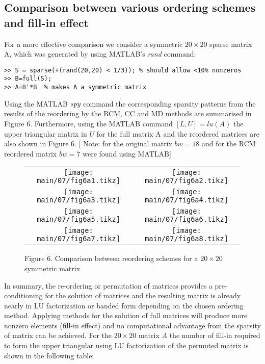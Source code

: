 
\subsection{Comparison between various ordering schemes and fill-in effect}
For a more effective comparison we consider a symmetric $20 \times 20$ sparse
matrix A, which was generated by using MATLAB's {\it{rand}} command:
\begin{lstlisting}
>> S = sparse(+(rand(20,20) < 1/3)); % should allow <10% nonzeros
>> B=full(S);
>> A=B'*B  % makes A a symmetric matrix
\end{lstlisting}

Using the MATLAB $\emph{spy}$ command the corresponding sparsity patterns from
the results of the reordering by the RCM, CC and MD methods are summarised in
Figure 6.  Furthermore, using the MATLAB command $[L,U] = lu(A)$ the upper
triangular matrix in $U$ for the full matrix A and the reordered matrices are
also shown in Figure 6. [ Note: for the original matrix $bw =18$ and for the RCM
reordered matrix $bw =7$ were found using MATLAB]
\newpage

\begin{figure}[H]
  \begin{center}
    \begin{tabular}{cc}
      \scriptsize\texttt{[image: main/07/fig6a1.tikz]} &
      \scriptsize\texttt{[image: main/07/fig6a2.tikz]}\\
      \scriptsize\texttt{[image: main/07/fig6a3.tikz]} &
      \scriptsize\texttt{[image: main/07/fig6a4.tikz]}\\
      \scriptsize\texttt{[image: main/07/fig6a5.tikz]} &
      \scriptsize\texttt{[image: main/07/fig6a6.tikz]}\\
      \scriptsize\texttt{[image: main/07/fig6a7.tikz]} &
      \scriptsize\texttt{[image: main/07/fig6a8.tikz]}\\
    \end{tabular}
  \end{center}
  Figure 6. Comparison between reordering schemes for a $20 \times 20$ symmetric matrix
\end{figure}
\vskip 10pt
\noindent

In summary, the re-ordering or permutation of matrices provides a
pre-conditioning for the solution of matrices and the resulting matrix is
already nearly in LU factorization or banded form depending on the chosen
ordering method. Applying methods for the solution of full matrices will produce
more nonzero elements (fill-in effect) and no computational advantage from the
sparsity of matrix can be achieved.
\vskip 10pt
\noindent
For the $20 \times 20$ matrix $A$ the number of fill-in required to form the
upper triangular using LU factorization of the permuted matrix is shown in the
following table:

